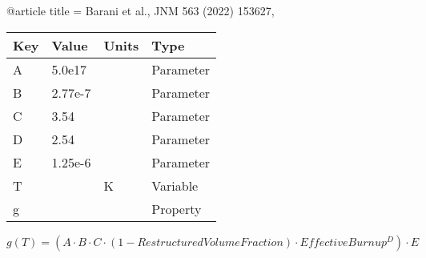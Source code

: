 @article{
title = {Barani et al., JNM 563 (2022) 153627},
}

\begin{tabular}{|l|l|l|l|}
    \hline
    Key & Value & Units & Type \\
    \hline
    A & 5.0e17 &  & Parameter\\
    B & 2.77e-7&  & Parameter \\
    C & 3.54   &  & Parameter \\
    D & 2.54 & & Parameter \\
    E & 1.25e-6 & & Parameter \\
    T &   & K    & Variable\\
    g &   &  & Property\\
    \hline
\end{tabular}

\begin{equation}
g(T)=(A \cdot B \cdot C \cdot (1 - RestructuredVolumeFraction ) \cdot EffectiveBurnup^D)\cdot E
\end{equation}

